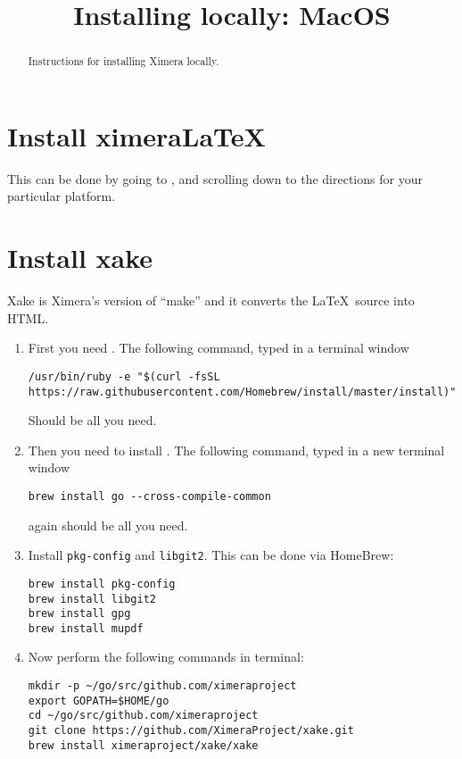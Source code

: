 \documentclass{ximera}
\title{Installing locally: MacOS}
\begin{document}
\begin{abstract}
Instructions for installing Ximera locally.
\end{abstract}
\maketitle


\section{Install ximeraLaTeX}

This can be done by going to , and scrolling
down to the directions for your particular platform.




\section{Install xake}

Xake is Ximera's version of ``make'' and it converts the
\LaTeX\ source into HTML.

\begin{enumerate}
\item First you need . The following command, typed in a terminal window
\begin{verbatim}
/usr/bin/ruby -e "$(curl -fsSL https://raw.githubusercontent.com/Homebrew/install/master/install)"
\end{verbatim}
Should be all you need. 
\item Then you need to install . The following command, typed in a new terminal window
\begin{verbatim}
brew install go --cross-compile-common
\end{verbatim}
again should be all you need.
\item Install \verb|pkg-config| and \verb|libgit2|. This can be done via HomeBrew:
\begin{verbatim}
brew install pkg-config
brew install libgit2
brew install gpg
brew install mupdf
\end{verbatim}
\item Now perform the following commands in terminal:
\begin{verbatim}
mkdir -p ~/go/src/github.com/ximeraproject
export GOPATH=$HOME/go
cd ~/go/src/github.com/ximeraproject
git clone https://github.com/XimeraProject/xake.git
brew install ximeraproject/xake/xake
\end{verbatim}
\end{enumerate}
\end{document}
